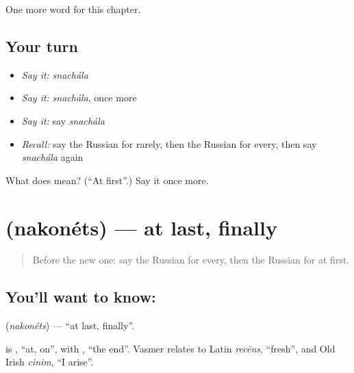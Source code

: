 \begin{grammarlens}[title={What you've built}]
One more word for this chapter.
\end{grammarlens}

\subsection*{Your turn}
\begin{itemize}
\raggedright
  \item \emph{Say it:} \emph{snachála}
  \item \emph{Say it:} \emph{snachála}, once more
  \item \emph{Say it:} say \emph{snachála}
  \item \emph{Recall:} say the Russian for rarely, then the Russian for every, then say \emph{snachála} again
\end{itemize}

\begin{tcolorbox}[breakable,colback=teal!4,colframe=teal!35!black,title={Before you move on}]
What does  mean? (\textquotedblleft{}At first\textquotedblright{}.) Say it once more.
\end{tcolorbox}
\section[\texorpdfstring{\ru{наконец} (nakonéts)}{наконец (nakonéts)}]{ (nakonéts) — at last, finally}

\label{lesson:RU-C150-nakonets}



\begin{quote}
Before the new one: say the Russian for every, then the Russian for at first.
\end{quote}

\subsection*{You'll want to know: }
\textbf{} (\emph{nakonéts}) — \textquotedblleft{}at last, finally\textquotedblright{}.

\begin{cousinweb}
\textbf{} is \emph{}, \textquotedblleft{}at, on\textquotedblright{}, with \emph{}, \textquotedblleft{}the end\textquotedblright{}. Vasmer relates \emph{} to Latin \emph{recēns}, \textquotedblleft{}fresh\textquotedblright{}, and Old Irish \emph{cinim}, \textquotedblleft{}I arise\textquotedblright{}.
\end{cousinweb}

